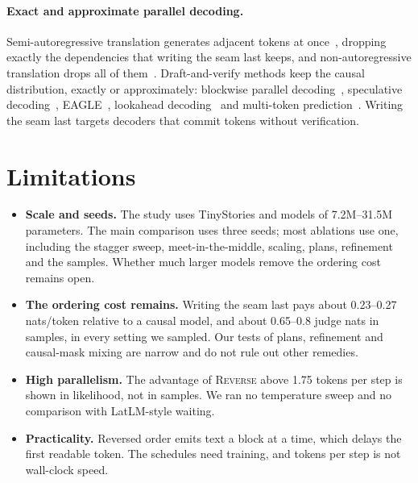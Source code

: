 \documentclass{article}
\theoremstyle{definition}
\theoremstyle{remark}
\newcommand{\name}[1]{\textup{\textsc{#1}}}
\newcommand{\rev}{\name{Reverse}\xspace}
\begin{document}
\paragraph{Exact and approximate parallel decoding.}
Semi-autoregressive translation generates adjacent tokens at once~\citep{wang2018semi}, dropping exactly the dependencies that writing the seam last keeps, and non-autoregressive translation drops all of them~\citep{gu2018nat}.
Draft-and-verify methods keep the causal distribution, exactly or approximately: blockwise parallel decoding~\citep{stern2018blockwise}, speculative decoding~\citep{leviathan2023speculative,chen2023speculative}, EAGLE~\citep{li2024eagle}, lookahead decoding~\citep{fu2024lookahead} and multi-token prediction~\citep{gloeckle2024mtp}.
Writing the seam last targets decoders that commit tokens without verification.

\section{Limitations}
\label{sec:limitations}

\begin{itemize}
  \item \textbf{Scale and seeds.} The study uses TinyStories and models of 7.2M--31.5M parameters. The main comparison uses three seeds; most ablations use one, including the stagger sweep, meet-in-the-middle, scaling, plans, refinement and the samples. Whether much larger models remove the ordering cost remains open.
  \item \textbf{The ordering cost remains.} Writing the seam last pays about 0.23--0.27 nats/token relative to a causal model, and about 0.65--0.8 judge nats in samples, in every setting we sampled. Our tests of plans, refinement and causal-mask mixing are narrow and do not rule out other remedies.
  \item \textbf{High parallelism.} The advantage of \rev above 1.75 tokens per step is shown in likelihood, not in samples. We ran no temperature sweep and no comparison with LatLM-style waiting.
  \item \textbf{Practicality.} Reversed order emits text a block at a time, which delays the first readable token. The schedules need training, and tokens per step is not wall-clock speed.
\end{itemize}

\end{document}
